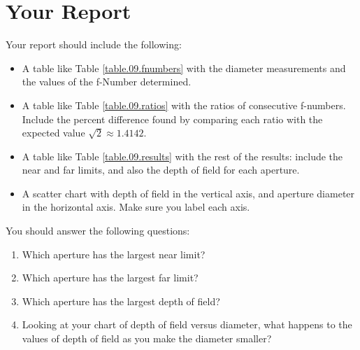 \section{Your Report}
%
Your report should include the following:
\begin{itemize}
    \item A table like Table \ref{table.09.fnumbers} with the diameter measurements and the values of the f-Number determined.
    \item A table like Table \ref{table.09.ratios} with the ratios of consecutive f-numbers. Include the percent difference found by comparing each ratio with the expected value $\sqrt{2} \approx 1.4142$.
    \item A table like Table \ref{table.09.results} with the rest of the results: include the near and far limits, and also the depth of field for each aperture.
    \item A scatter chart with depth of field in the vertical axis, and aperture diameter in the horizontal axis. Make sure you label each axis.
\end{itemize}
You should answer the following questions:
\begin{enumerate}
    \item Which aperture has the largest near limit?
    \item Which aperture has the largest far limit?
    \item Which aperture has the largest depth of field?
    \item Looking at your chart of depth of field versus diameter, what happens to the values of depth of field as you make the diameter smaller?
\end{enumerate}
%
\newpage
